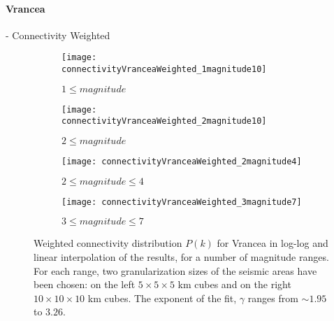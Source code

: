 \paragraph{Vrancea} - Connectivity Weighted
\begin{figure}[!h]
\begin{subfigure}{.99\textwidth}
  \centering
  \texttt{[image: connectivityVranceaWeighted\_1magnitude10]}
  \caption{$1 \leq magnitude$}
  \label{fig:conWeiVr1mag10}
\end{subfigure}%

\begin{subfigure}{.99\textwidth}
  \centering
  \texttt{[image: connectivityVranceaWeighted\_2magnitude10]}
  \caption{$2 \leq magnitude$}
  \label{fig:conWeiVr2mag10}
\end{subfigure}%

\begin{subfigure}{.99\textwidth}
  \centering
  \texttt{[image: connectivityVranceaWeighted\_2magnitude4]}
  \caption{$2\leq magnitude \leq 4$}
  \label{fig:conWeiVr2mag4}
\end{subfigure}%

\begin{subfigure}{.99\textwidth}
  \centering
  \texttt{[image: connectivityVranceaWeighted\_3magnitude7]}
  \caption{$3 \leq magnitude \leq 7$}
  \label{fig:conWeiVr3mag7}
\end{subfigure}%

\caption{Weighted connectivity distribution $P(k)$ for Vrancea in log-log and linear interpolation of the results, for a number of magnitude ranges. For each range, two granularization sizes of the seismic areas have been chosen: on the left $5 \times 5 \times5 $ km cubes and on the right $10 \times 10 \times 10$ km cubes. The exponent of the fit, $\gamma$ ranges from $\sim 1.95$ to $3.26$.}
\label{fig:connectivityVrWeighted}
\end{figure}


\clearpage
